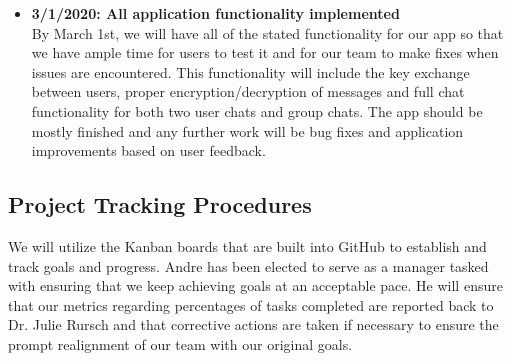 \documentclass[11pt]{article}
\begin{document}
\begin{itemize}
    \item{\textbf{3/1/2020: All application functionality implemented}\\
By March 1st, we will have all of the stated functionality for our app so that we have ample time for users to test it and for our team to make fixes when issues are encountered. This functionality will include the key exchange between users, proper encryption/decryption of messages and full chat functionality for both two user chats and group chats. The app should be mostly finished and any further work will be bug fixes and application improvements based on user feedback.}
\end{itemize}

\subsection{Project Tracking Procedures}
We will utilize the Kanban boards that are built into GitHub to establish and track goals and progress. Andre has been elected to serve as a manager tasked with ensuring that we keep achieving goals at an acceptable pace. He will ensure that our metrics regarding percentages of tasks completed are reported back to Dr. Julie Rursch and that corrective actions are taken if necessary to ensure the prompt realignment of our team with our original goals. 
\end{document}
